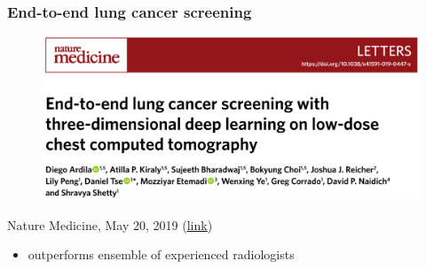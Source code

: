 \documentclass{beamer}
\begin{document}
\begin{frame}
\frametitle{End-to-end lung cancer screening}
\begin{figure}
	\centering
	\includegraphics[width=\textwidth]{images/lung_cancer_end.png}
\end{figure}
Nature Medicine, May 20, 2019 (\href{https://www.nature.com/articles/s41591-019-0447-x}{{\color{blue}\underline{link}}})
\begin{itemize}
	\item outperforms ensemble of experienced radiologists
\end{itemize}
\end{frame}
\end{document}
